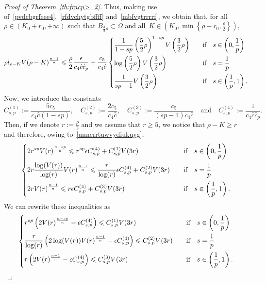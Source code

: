 \documentclass[12pt]{article}
\numberwithin{equation}{section}
\renewcommand{\leq}{\leqslant}
\renewcommand{\geq}{\geqslant}
\begin{document}
\begin{proof}[Proof of Theorem~\ref{th:fracp>=2}]
Thus, making use of~\eqref{pvdcbgrfeee4},~\eqref{rfdvchytgbffff} and~\eqref{mbfvgtrrrrf}, we obtain that,
for all~$\rho\in \left(K_0+r_0,+\infty\right)$ such that $B_{\frac{3}{2}\rho}\subset\Omega$ and all~$K\in \left(K_0, \min\left\lbrace \rho-r_0,\frac{\rho}{2}\right\rbrace\right)$,
\begin{equation}\label{unnerrtuwvydiukuyg}
\rho l_{\rho-K}V(\rho-K)^\frac{n-1}{n}\leq \frac{\rho}{2}\frac{\epsilon}{c_4\hat{c}\hat{c}_p}+\frac{c_5}{c_4\hat{c}}\begin{dcases}
\frac{1}{1-sp}\left(\frac{5}{2}\rho\right)^{1-sp}V\left(\frac{3}{2}\rho\right)\quad &\mbox{if}\quad s\in \left(0,\frac{1}{p}\right)\\
\log\left(\frac{5}{2}\rho\right)V\left(\frac{3}{2}\rho\right)\quad &\mbox{if}\quad s=\frac{1}{p}\\
\frac{1}{sp-1}V\left(\frac{3}{2}\rho\right)\quad &\mbox{if}\quad s\in \left(\frac{1}{p},1\right).
\end{dcases}
\end{equation}
Now, we introduce the constants  
\begin{equation*}
C_{s,p}^{(1)}:=\frac{5 c_5}{c_4\hat{c}(1-sp)},\quad C_{s,p}^{(2)}:=\frac{2c_5}{c_4\hat{c}},\quad C_{s,p}^{(3)}:= \frac{c_5}{(sp-1)c_4\hat{c}}\quad\mbox{and}\quad C_{s,p}^{(4)}:=\frac{1}{c_4\hat{c}\hat{c}_p}.
\end{equation*}
Then, if we denote $r:=\frac{\rho}{2}$ and we assume that $r\geq 5$, we notice that $\rho-K\geq r$ and therefore, owing to~\eqref{unnerrtuwvydiukuyg},
\begin{equation*}
\begin{dcases}
2r^{sp} V(r)^{\frac{n-sp}{n}}\leq r^{sp} \epsilon C_{s,p}^{(4)}+C_{s,p}^{(1)} V(3r)\quad &\mbox{if}\quad s\in \left(0,\frac{1}{p}\right)\\
2r\frac{\log(V(r))}{\log(r)}V(r)^{\frac{n-1}{n}} \leq \frac{r}{\log(r)} \epsilon C_{s,p}^{(4)}+ C_{s,p}^{(2)}V(3r)\quad &\mbox{if}\quad s=\frac{1}{p}\\
2rV(r)^{\frac{n-1}{n}}\leq r \epsilon C_{s,p}^{(4)}+ C_{s,p}^{(3)} V(3r)\quad &\mbox{if}\quad  s\in \left(\frac{1}{p},1\right).
\end{dcases}
\end{equation*}
We can rewrite these inequalities as 
\begin{equation}\label{iopre}
\begin{dcases}
r^{sp} \left(2V(r)^{\frac{n-sp}{n}}-\epsilon C_{s,p}^{(4)}\right)\leq C_{s,p}^{(1)} V(3r)\quad &\mbox{if}\quad s\in \left(0,\frac{1}{p}\right)\\
\frac{r}{\log(r)} \left(2\log(V(r))V(r)^{\frac{n-1}{n}}-\epsilon C_{s,p}^{(4)}\right) \leq  C_{s,p}^{(2)}V(3r)\quad &\mbox{if}\quad s=\frac{1}{p}\\
r\left(2V(r)^{\frac{n-1}{n}}-\epsilon C_{s,p}^{(4)}\right) \leq  C_{s,p}^{(3)} V(3r)\quad &\mbox{if}\quad  s\in \left(\frac{1}{p},1\right).
\end{dcases}
\end{equation}


\end{proof}
\end{document}
